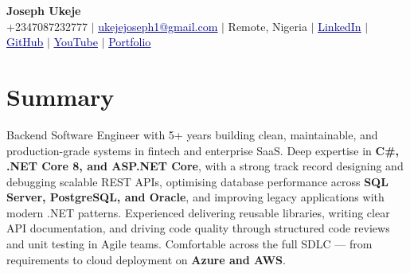 \documentclass[letterpaper,10pt]{article}
\newcommand{\link}[2]{\href{#1}{\textcolor{darkblue}{\underline{#2}}}}
\begin{document}
\begin{center}
    \textbf{\Large Joseph Ukeje} \\ \vspace{2pt}
    \small +2347087232777 $|$
    \link{mailto:ukejejoseph1@gmail.com}{ukejejoseph1@gmail.com} $|$
    Remote, Nigeria $|$
    \link{https://www.linkedin.com/in/joseph-ukeje-8a0300220/}{LinkedIn} $|$
    \link{https://github.com/UkejeJoseph}{GitHub} $|$
    \link{https://www.youtube.com/@josephukeje8068}{YouTube} $|$
    \link{https://porfolionew-puce.vercel.app/}{Portfolio}
\end{center}

\section{Summary}
\small{Backend Software Engineer with 5+ years building clean, maintainable, and production-grade systems in fintech and enterprise SaaS. Deep expertise in \textbf{C\#, .NET Core 8, and ASP.NET Core}, with a strong track record designing and debugging scalable REST APIs, optimising database performance across \textbf{SQL Server, PostgreSQL, and Oracle}, and improving legacy applications with modern .NET patterns. Experienced delivering reusable libraries, writing clear API documentation, and driving code quality through structured code reviews and unit testing in Agile teams. Comfortable across the full SDLC --- from requirements to cloud deployment on \textbf{Azure and AWS}.}

\end{document}
